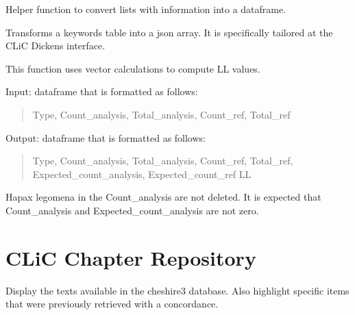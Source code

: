 \documentclass[letterpaper,10pt,english]{sphinxmanual}
\begin{document}
\begin{fulllineitems}
\label{apidoc:keywords.format_wordlist}
Helper function to convert lists with information into a dataframe.

\end{fulllineitems}


\begin{fulllineitems}
\label{apidoc:keywords.keywords_to_json}
Transforms a keywords table into a json array. 
It is specifically tailored at the CLiC Dickens interface.

\end{fulllineitems}


\begin{fulllineitems}
\label{apidoc:keywords.log_likelihood}
This function uses vector calculations to compute LL values.

Input: dataframe that is formatted as follows:
\begin{quote}

Type, 
Count\_analysis, 
Total\_analysis, 
Count\_ref, 
Total\_ref
\end{quote}

Output: dataframe that is formatted as follows:
\begin{quote}

Type, 
Count\_analysis, 
Total\_analysis, 
Count\_ref, 
Total\_ref, 
Expected\_count\_analysis,
Expected\_count\_ref
LL
\end{quote}

Hapax legomena in the Count\_analysis are not deleted.
It is expected that Count\_analysis and Expected\_count\_analysis are not zero.

\end{fulllineitems}



\section{CLiC Chapter Repository}
\label{apidoc:clic-chapter-repository}\label{apidoc:module-chapter_repository}
Display the texts available in the cheshire3 database. Also highlight specific
items that were previously retrieved with a concordance.
\end{document}
